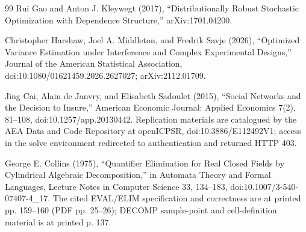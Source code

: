 \documentclass{article}
\begin{document}
\begin{thebibliography}{99}
   Rui Gao and Anton J. Kleywegt (2017), ``Distributionally Robust Stochastic Optimization with Dependence Structure,'' arXiv:1701.04200.

   Christopher Harshaw, Joel A. Middleton, and Fredrik Savje (2026), ``Optimized Variance Estimation under Interference and Complex Experimental Designs,'' Journal of the American Statistical Association, doi:10.1080/01621459.2026.2627027; arXiv:2112.01709.

   Jing Cai, Alain de Janvry, and Elisabeth Sadoulet (2015), ``Social Networks and the Decision to Insure,'' American Economic Journal: Applied Economics 7(2), 81--108, doi:10.1257/app.20130442. Replication materials are catalogued by the AEA Data and Code Repository at openICPSR, doi:10.3886/E112492V1; access in the solve environment redirected to authentication and returned HTTP 403.

   George E. Collins (1975), ``Quantifier Elimination for Real Closed Fields by Cylindrical Algebraic Decomposition,'' in Automata Theory and Formal Languages, Lecture Notes in Computer Science 33, 134--183, doi:10.1007/3-540-07407-4\_17. The cited EVAL/ELIM specification and correctness are at printed pp. 159--160 (PDF pp. 25--26); DECOMP sample-point and cell-definition material is at printed p. 137.

\end{thebibliography}
\end{document}
